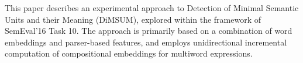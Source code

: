 This paper describes an experimental approach to Detection of Minimal Semantic Units and their Meaning (DiMSUM), explored within the framework of SemEval'16 Task 10. The approach is primarily based on a combination of word embeddings and parser-based features, and employs unidirectional incremental computation of compositional embeddings for multiword expressions.
